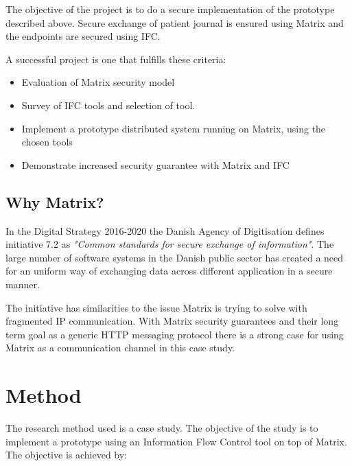 The objective of the project is to do a secure implementation of the prototype described above. Secure exchange of patient journal is ensured using Matrix and the endpoints are secured using IFC.

A successful project is one that fulfills these criteria: 

\begin{itemize}
	\item Evaluation of Matrix security model
	\item Survey of IFC tools and selection of tool.
	\item Implement a prototype distributed system running on Matrix, using the chosen tools
	\item Demonstrate increased security guarantee with Matrix and IFC
\end{itemize}   


\subsection{Why Matrix?}
In the Digital Strategy 2016-2020 the Danish Agency of Digitisation defines initiative 7.2 as \emph{"Common standards for secure exchange of information"}. The large number of software systems in the Danish public sector has created a need for an uniform way of exchanging data across different application in a secure manner\cite{TheGovernment2016}. 

The initiative has similarities to the issue Matrix is trying to solve with fragmented IP communication. With Matrix security guarantees and their long term goal as a generic HTTP messaging protocol there is a strong case for using Matrix as a communication channel in this case study.


 
\section{Method}
The research method used is a case study. The objective of the study is to implement a prototype using an Information Flow Control tool on top of Matrix. 
The objective is achieved by:

